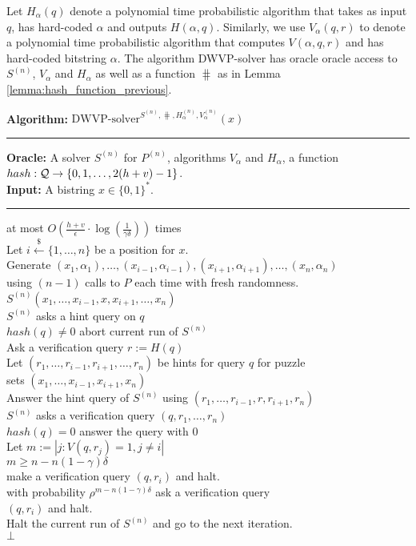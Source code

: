 Let $H_{\alpha}(q)$ denote a polynomial time probabilistic algorithm that takes as input $q$,
has hard-coded $\alpha$ and outputs $H(\alpha, q)$.
Similarly, we use $V_{\alpha}(q,r)$ to denote a polynomial time probabilistic algorithm that computes $V(\alpha, q, r)$ and has hard-coded bitstring $\alpha$.
The algorithm DWVP-solver has oracle oracle access to $S^{(n)}$, $V_{\alpha}$ and $H_{\alpha}$ as well as a function $\hash$ as in Lemma \ref{lemma:hash_function_previous}.
%
\begin{codeblock}
  \textbf{Algorithm:} $\text{DWVP-solver}^{S^{(n)}, \hash, H_{\alpha}^{(n)}, V_{\alpha}^{(n)}}(x)$
  \medskip
  \hrule
  \textbf{Oracle:}  A solver $S^{(n)}$ for $P^{(n)}$, algorithms $V_{\alpha}$ and $H_{\alpha}$, a function $hash : \mathcal{Q} \rightarrow \{0,1, \dotsc, 2(h+v)-1\}$.\\
  \textbf{Input:} A bistring $x \in \{0,1\}^{*}$.
  \medskip\hrule
  \Repeat at most $O(\frac{h+v}{\epsilon} \cdot \log(\frac{1}{\gamma\delta}))$ times \\
  \IndI Let $i \xleftarrow{\$} \{1, \dotsc, n\}$ be a position for $x$.\\
  \IndI Generate $(x_1, \alpha_1), \dotsc, (x_{i-1}, \alpha_{i-1}), (x_{i+1}, \alpha_{i+1}), \dotsc, (x_n, \alpha_n)$ \\
  \IndI using $(n-1)$ calls to $P$ each time with fresh randomness.\\
  \IndI \Run $S^{(n)}(x_1, \dotsc, x_{i-1}, x, x_{i+1}, \dotsc, x_n)$\\
  \IndII \If $S^{(n)}$ asks a hint query on $q$ \Then \\
  \IndIII \If $hash(q) \neq 0$ \Then abort current run of $S^{(n)}$\\
  \IndIII Ask a verification query $r := H(q)$\\
  \IndIII Let $(r_1, \dotsc, r_{i-1}, r_{i+1}, \dotsc, r_{n})$ be hints for query $q$ for puzzle\\
  \IndIII sets $(x_1, \dotsc, x_{i-1}, x_{i+1}, x_n)$\\
  \IndIII Answer the hint query of $S^{(n)}$ using $(r_1, \dots, r_{i-1}, r, r_{i+1}, r_n)$\\
  \IndII \If $S^{(n)}$ asks a verification query $(q, r_1, \dots, r_n)$ \Then \\
  \IndIII \If $hash(q) = 0$ \Then answer the query with $0$\\
  \IndIII Let $m := |j: V(q,r_j) = 1, j \neq i|$\\
  \IndIII \If $m \geq n - n(1-\gamma)\delta$ \Then \\
  \IndIIII make a verification query $(q, r_i)$ and halt.\\
  \IndIII \Else with probability $\rho^{m - n(1-\gamma)\delta}$ ask a verification query \\
  \IndIIII $(q, r_i)$ and halt. \\
  \IndIII Halt the current run of $S^{(n)}$ and go to the next iteration.\\
  \Return $\bot$
\end{codeblock}

